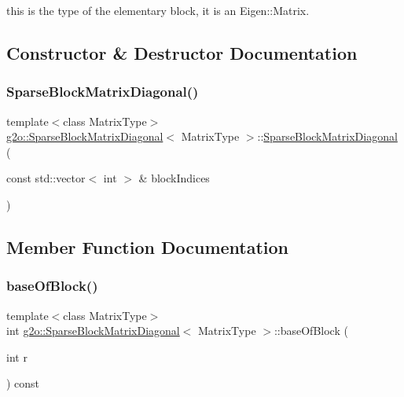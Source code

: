 this is the type of the elementary block, it is an Eigen\+::\+Matrix. 



\subsection{Constructor \& Destructor Documentation}
\mbox{\label{classg2o_1_1_sparse_block_matrix_diagonal_a0e01566c4ff881af058f366672291b27}} 
\subsubsection{\texorpdfstring{Sparse\+Block\+Matrix\+Diagonal()}{SparseBlockMatrixDiagonal()}}
{\footnotesize\ttfamily template$<$class Matrix\+Type$>$ \\
\mbox{\hyperlink{classg2o_1_1_sparse_block_matrix_diagonal}{g2o\+::\+Sparse\+Block\+Matrix\+Diagonal}}$<$ Matrix\+Type $>$\+::\mbox{\hyperlink{classg2o_1_1_sparse_block_matrix_diagonal}{Sparse\+Block\+Matrix\+Diagonal}} (\begin{DoxyParamCaption}\item[{const std\+::vector$<$ int $>$ \&}]{block\+Indices }\end{DoxyParamCaption})\hspace{0.3cm}{\ttfamily [inline]}}



\subsection{Member Function Documentation}
\mbox{\label{classg2o_1_1_sparse_block_matrix_diagonal_a4cc17dfc19f065595dd2b09de0440df5}} 
\subsubsection{\texorpdfstring{base\+Of\+Block()}{baseOfBlock()}}
{\footnotesize\ttfamily template$<$class Matrix\+Type$>$ \\
int \mbox{\hyperlink{classg2o_1_1_sparse_block_matrix_diagonal}{g2o\+::\+Sparse\+Block\+Matrix\+Diagonal}}$<$ Matrix\+Type $>$\+::base\+Of\+Block (\begin{DoxyParamCaption}\item[{int}]{r }\end{DoxyParamCaption}) const\hspace{0.3cm}{\ttfamily [inline]}}



